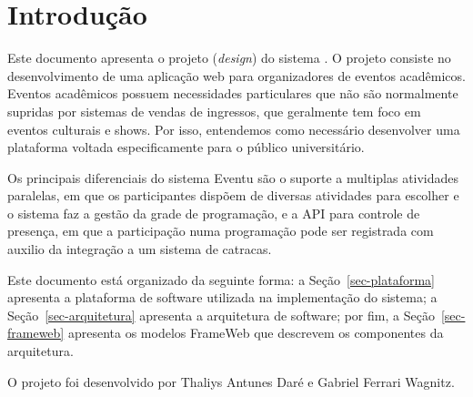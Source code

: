 \chapter{Introdução}
\label{sec-intro}
\vspace{-1cm}

Este documento apresenta o projeto (\textit{design}) do sistema \emph{\imprimirtitulo}. 
O projeto consiste no desenvolvimento de uma aplicação web para organizadores de eventos acadêmicos. Eventos acadêmicos possuem necessidades particulares que não são normalmente supridas por sistemas de vendas de ingressos, que geralmente tem foco em eventos culturais e shows. Por isso, entendemos como necessário desenvolver uma plataforma voltada especificamente para o público universitário.

Os principais diferenciais do sistema Eventu são o suporte a multiplas atividades paralelas, em que os participantes dispõem de diversas atividades para escolher e o sistema faz a gestão da grade de programação, e a API para controle de presença, em que a participação numa programação pode ser registrada com auxilio da integração a um sistema de catracas.

Este documento está organizado da seguinte forma: 
a Seção~\ref{sec-plataforma} apresenta a plataforma de software utilizada na implementação do sistema;
a Seção~\ref{sec-arquitetura} apresenta a arquitetura de software; por fim, 
a Seção~\ref{sec-frameweb} apresenta os modelos FrameWeb que descrevem os componentes da arquitetura.

O projeto foi desenvolvido por Thaliys Antunes Daré e Gabriel Ferrari Wagnitz.

